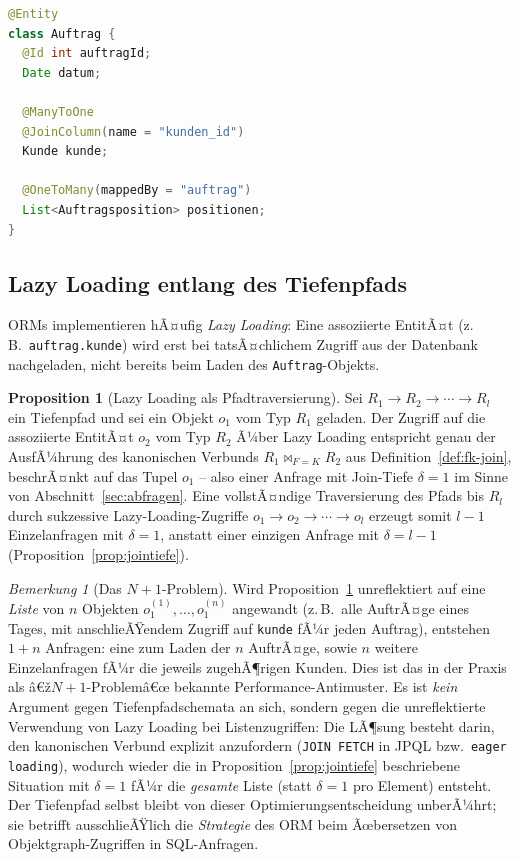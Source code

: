 ﻿\documentclass[a4paper,12pt]{report}
\theoremstyle{definition}
\newtheorem{proposition}[theorem]{Proposition}
\theoremstyle{remark}
\newtheorem{remark}{Bemerkung}[chapter]
\begin{document}
\begin{lstlisting}[language=Java]
@Entity
class Auftrag {
  @Id int auftragId;
  Date datum;

  @ManyToOne
  @JoinColumn(name = "kunden_id")
  Kunde kunde;

  @OneToMany(mappedBy = "auftrag")
  List<Auftragsposition> positionen;
}
\end{lstlisting}

\subsection{Lazy Loading entlang des Tiefenpfads}
\label{sec:lazy-loading}

ORMs implementieren hÃ¤ufig \emph{Lazy Loading}: Eine assoziierte
EntitÃ¤t (z.\,B.\ \texttt{auftrag.kunde}) wird erst bei tatsÃ¤chlichem
Zugriff aus der Datenbank nachgeladen, nicht bereits beim Laden des
\texttt{Auftrag}-Objekts.

\begin{proposition}[Lazy Loading als Pfadtraversierung]
\label{prop:lazy-loading}
Sei $R_1\to R_2\to\cdots\to R_l$ ein Tiefenpfad und sei ein Objekt
$o_1$ vom Typ $R_1$ geladen. Der Zugriff auf die assoziierte EntitÃ¤t
$o_2$ vom Typ $R_2$ Ã¼ber Lazy Loading entspricht genau der AusfÃ¼hrung
des kanonischen Verbunds $R_1\Join_{F=K}R_2$ aus
Definition~\ref{def:fk-join}, beschrÃ¤nkt auf das Tupel $o_1$ -- also
einer Anfrage mit Join-Tiefe $\delta=1$ im Sinne von
Abschnitt~\ref{sec:abfragen}. Eine vollstÃ¤ndige Traversierung des
Pfads bis $R_l$ durch sukzessive Lazy-Loading-Zugriffe
$o_1\to o_2\to\cdots\to o_l$ erzeugt somit $l-1$ Einzelanfragen mit
$\delta=1$, anstatt einer einzigen Anfrage mit $\delta=l-1$
(Proposition~\ref{prop:jointiefe}).
\end{proposition}

\begin{remark}[Das $N{+}1$-Problem]
\label{rem:n-plus-1}
Wird Proposition~\ref{prop:lazy-loading} unreflektiert auf eine
\emph{Liste} von $n$ Objekten $o_1^{(1)},\ldots,o_1^{(n)}$ angewandt
(z.\,B.\ alle AuftrÃ¤ge eines Tages, mit anschlieÃŸendem Zugriff auf
\texttt{kunde} fÃ¼r jeden Auftrag), entstehen $1+n$ Anfragen: eine zum
Laden der $n$ AuftrÃ¤ge, sowie $n$ weitere Einzelanfragen fÃ¼r die
jeweils zugehÃ¶rigen Kunden. Dies ist das in der Praxis als
â€ž$N{+}1$-Problemâ€œ bekannte Performance-Antimuster. Es ist
\emph{kein} Argument gegen Tiefenpfadschemata an sich, sondern gegen
die unreflektierte Verwendung von Lazy Loading bei Listenzugriffen:
Die LÃ¶sung besteht darin, den kanonischen Verbund explizit
anzufordern (\texttt{JOIN FETCH} in JPQL bzw.\ \texttt{eager
loading}), wodurch wieder die in
Proposition~\ref{prop:jointiefe} beschriebene Situation mit
$\delta=1$ fÃ¼r die \emph{gesamte} Liste (statt $\delta=1$ pro Element)
entsteht. Der Tiefenpfad selbst bleibt von dieser
Optimierungsentscheidung unberÃ¼hrt; sie betrifft ausschlieÃŸlich die
\emph{Strategie} des ORM beim Ãœbersetzen von Objektgraph-Zugriffen in
SQL-Anfragen.
\end{remark}
\end{document}
